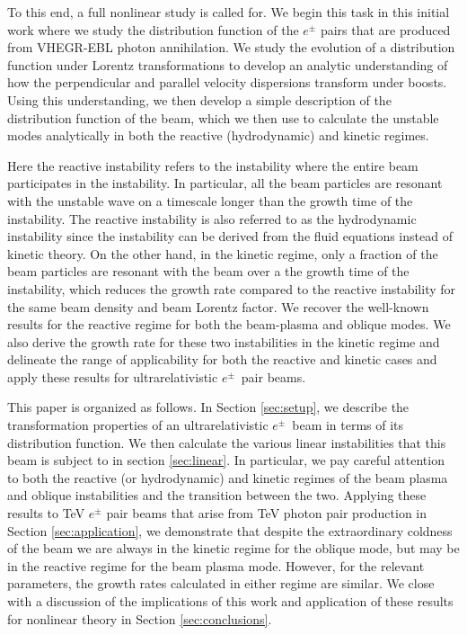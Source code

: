\documentclass[usenatbib,iop,apj,numberedappendix]{aeb_emulateapj_2015}
\newcommand{\epm}{\ensuremath{e^{\pm}}}
\begin{document}
To this end, a full nonlinear study is called for.  We begin this task in this initial work where we study the distribution function of the $\epm$ pairs that are produced from VHEGR-EBL photon annihilation.  We study the evolution of a distribution function under Lorentz transformations to develop an analytic understanding of how the perpendicular and parallel velocity dispersions transform under boosts.  Using this understanding, we then develop a simple description of the distribution function of the beam, which we then use to calculate the unstable modes analytically in both the reactive (hydrodynamic) and kinetic regimes.

Here the reactive instability refers to the instability where the entire beam participates in the instability.  In particular, all the beam particles are resonant with the unstable wave on a timescale longer than the growth time of the instability.  The reactive instability is also referred to as the hydrodynamic instability since the instability can be derived from the fluid equations instead of kinetic theory.  On the other hand, in the kinetic regime, only a fraction of the beam particles are resonant with the beam over a the growth time of the instability, which reduces the growth rate compared to the reactive instability for the same beam density and beam Lorentz factor.  We recover the well-known results for the reactive regime for both the beam-plasma and oblique modes.  We also derive the growth rate for these two instabilities in the kinetic regime and delineate the range of applicability for both the reactive and kinetic cases and apply these results for ultrarelativistic \epm\ pair beams. 

This paper is organized as follows.  In Section \ref{sec:setup}, we describe the transformation properties of an ultrarelativistic \epm\ beam in terms of its distribution function.  We then calculate the various linear instabilities that this beam is subject to in section \ref{sec:linear}.  In particular, we pay careful attention to both the reactive (or hydrodynamic) and kinetic regimes of the beam plasma and oblique instabilities and the transition between the two.  Applying these results to TeV $\epm$ pair beams that arise from TeV photon pair production in Section \ref{sec:application},
we demonstrate that despite the extraordinary coldness of the beam we are always in the kinetic regime for the oblique mode, but may be in the reactive regime for the beam plasma mode.  However, for the relevant parameters, the growth rates calculated in either regime are similar.  We close with a discussion of the implications of this work and application of these results for nonlinear theory in Section \ref{sec:conclusions}.
\end{document}
